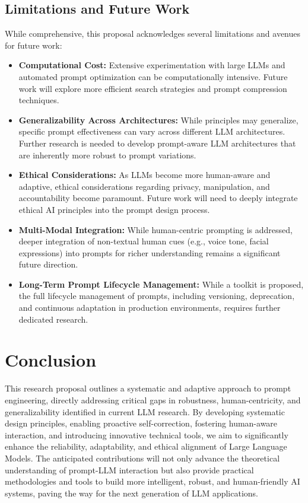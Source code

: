 \documentclass{article}
\begin{document}
\subsection{Limitations and Future Work}
While comprehensive, this proposal acknowledges several limitations and avenues for future work:
\begin{itemize}[noitemsep]
    \item \textbf{Computational Cost:} Extensive experimentation with large LLMs and automated prompt optimization can be computationally intensive. Future work will explore more efficient search strategies and prompt compression techniques.
    \item \textbf{Generalizability Across Architectures:} While principles may generalize, specific prompt effectiveness can vary across different LLM architectures. Further research is needed to develop prompt-aware LLM architectures that are inherently more robust to prompt variations.
    \item \textbf{Ethical Considerations:} As LLMs become more human-aware and adaptive, ethical considerations regarding privacy, manipulation, and accountability become paramount. Future work will need to deeply integrate ethical AI principles into the prompt design process.
    \item \textbf{Multi-Modal Integration:} While human-centric prompting is addressed, deeper integration of non-textual human cues (e.g., voice tone, facial expressions) into prompts for richer understanding remains a significant future direction.
    \item \textbf{Long-Term Prompt Lifecycle Management:} While a toolkit is proposed, the full lifecycle management of prompts, including versioning, deprecation, and continuous adaptation in production environments, requires further dedicated research.
\end{itemize}

\section{Conclusion}
This research proposal outlines a systematic and adaptive approach to prompt engineering, directly addressing critical gaps in robustness, human-centricity, and generalizability identified in current LLM research. By developing systematic design principles, enabling proactive self-correction, fostering human-aware interaction, and introducing innovative technical tools, we aim to significantly enhance the reliability, adaptability, and ethical alignment of Large Language Models. The anticipated contributions will not only advance the theoretical understanding of prompt-LLM interaction but also provide practical methodologies and tools to build more intelligent, robust, and human-friendly AI systems, paving the way for the next generation of LLM applications.
\end{document}
